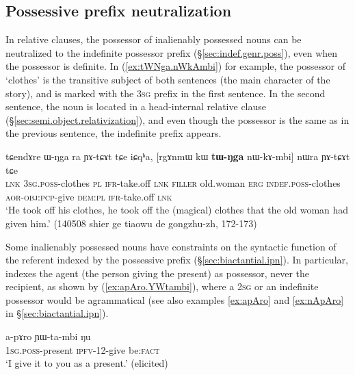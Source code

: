 \subsection{Possessive prefix neutralization} \label{sec:relative.possessor.neutralization}
In relative clauses, the possessor of inalienably possessed nouns can be neutralized to the indefinite possessor prefix  (§\ref{sec:indef.genr.poss}), even when the possessor is definite. In (\ref{ex:tWNga.nWkAmbi}) for example, the possessor of  `clothes' is the transitive subject of both sentences (the main character of the story), and is marked with the \textsc{3sg} prefix  in the first sentence. In the second sentence, the noun  is located in a head-internal relative clause (§\ref{sec:semi.object.relativization}), and even though the possessor is the same as in the previous sentence, the indefinite prefix  appears.  
 
\begin{exe}
\ex \label{ex:tWNga.nWkAmbi}
\gll tɕendɤre ɯ-ŋga ra ɲɤ-tɕɤt tɕe iɕqʰa,  [rgɤnmɯ kɯ \textbf{tɯ-ŋga} nɯ-kɤ-mbi] nɯra ɲɤ-tɕɤt tɕe   \\
\textsc{lnk} \textsc{3sg}.\textsc{poss}-clothes \textsc{pl} \textsc{ifr}-take.off \textsc{lnk} \textsc{filler} old.woman \textsc{erg} \textsc{indef}.\textsc{poss}-clothes \textsc{aor}-\textsc{obj}:\textsc{pcp}-give \textsc{dem}:\textsc{pl} \textsc{ifr}-take.off \textsc{lnk} \\
\glt `He took off his clothes, he took off the (magical) clothes that the old woman had given him.' (140508 shier ge tiaowu de gongzhu-zh, 172-173)
\end{exe}

Some inalienably possessed nouns have constraints on the syntactic function of the referent indexed by the possessive prefix (§\ref{sec:biactantial.ipn}). In particular,  indexes the agent (the person giving the present) as possessor, never the recipient, as shown by (\ref{ex:apAro.YWtambi}), where a \textsc{2sg}  or an indefinite possessor  would be agrammatical (see also examples \ref{ex:apAro} and \ref{ex:nApAro} in §\ref{sec:biactantial.ipn}).
	
\begin{exe}
\ex \label{ex:apAro.YWtambi}
\gll a-pɤro ɲɯ-ta-mbi ŋu \\
\textsc{1sg}.\textsc{poss}-present \textsc{ipfv}-1\fl{}2-give be:\textsc{fact} \\
\glt `I give it to you as a present.' (elicited)
\end{exe} 
	 
